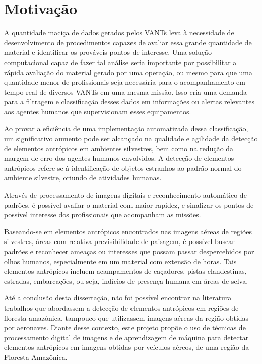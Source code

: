 \section{Motivação}

A quantidade maciça de dados gerados pelos VANTs leva à necessidade de desenvolvimento de procedimentos capazes de avaliar essa grande quantidade de material e identificar os prováveis pontos de interesse. Uma solução computacional capaz de fazer tal análise seria importante por possibilitar a rápida avaliação do material gerado por uma operação, ou mesmo para que uma quantidade menor de profissionais seja necessária para o acompanhamento em tempo real de diversos VANTs em uma mesma missão. Isso cria uma demanda para a filtragem e classificação desses dados em informações ou alertas relevantes aos agentes humanos que supervisionam esses equipamentos.

Ao provar a eficiência de uma implementação automatizada dessa classificação, um significativo aumento pode ser alcançado na qualidade e agilidade da detecção de elementos antrópicos em ambientes silvestres, bem como na redução da margem de erro dos agentes humanos envolvidos. A detecção de elementos antrópicos refere-se à identificação de objetos estranhos ao padrão normal do ambiente silvestre, oriundo de atividades humanas.

Através de processamento de imagens digitais e reconhecimento automático de padrões, é possível avaliar o material com maior rapidez, e sinalizar os pontos de possível interesse dos profissionais que acompanham as missões.

Baseando-se em elementos antrópicos encontrados nas imagens aéreas de regiões silvestres, áreas com relativa previsibilidade de paisagem, é possível buscar padrões e reconhecer ameaças ou interesses que possam passar despercebidos por olhos humanos, especialmente em um material com extensão de horas. Tais elementos antrópicos incluem acampamentos de caçadores, pistas clandestinas, estradas, embarcações, ou seja, indícios de presença humana em áreas de selva.

Até a conclusão desta dissertação, não foi possível encontrar na literatura trabalhos que abordassem a detecção de elementos antrópicos em regiões de floresta amazônica, tampouco que utilizassem imagens aéreas da região obtidas por aeronaves. Diante desse contexto, este projeto propõe o uso de técnicas de processamento digital de imagens e de aprendizagem de máquina para detectar elementos antrópicos em imagens obtidas por veículos aéreos, de uma região da Floresta Amazônica.


